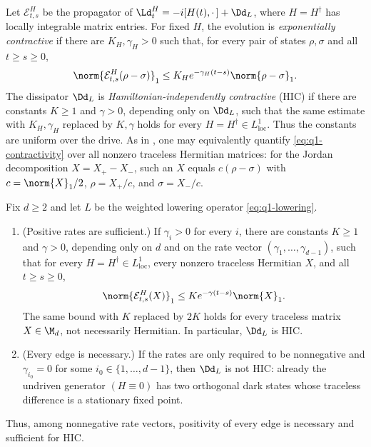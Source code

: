 \documentclass[class=article,11pt,a4paper,crop=false]{standalone}
\begin{document}
\begin{definition}\label{def:q1-hic}
	Let $\mathcal E^H_{t,s}$ be the propagator of
	$\Ld^H_t=-i[H(t),\cdot\,]+\Dd_L$, where $H=H^\dagger$ has locally integrable
	matrix entries. For fixed $H$, the evolution is \emph{exponentially
		contractive} if there are $K_H,\gamma_H>0$ such that, for every pair of
	states $\rho,\sigma$ and all $t\ge s\ge0$,
	\begin{equation}
		\norm{\mathcal E^H_{t,s}(\rho-\sigma)}_1
		\le K_H e^{-\gamma_H(t-s)}\norm{\rho-\sigma}_1.
		\label{eq:q1-contractivity}
	\end{equation}
	The dissipator $\Dd_L$ is \emph{Hamiltonian-independently contractive} (HIC)
	if there are constants $K\ge1$ and $\gamma>0$, depending only on $\Dd_L$,
	such that the same estimate with $K_H,\gamma_H$ replaced by $K,\gamma$
	holds for every $H=H^\dagger\in L^1_{\mathrm{loc}}$. Thus the constants are
	uniform over the drive. As in
	, one may equivalently quantify
	\eqref{eq:q1-contractivity} over all nonzero traceless Hermitian matrices:
	for the Jordan decomposition $X=X_+-X_-$, such an $X$ equals
	$c(\rho-\sigma)$ with
	$c=\norm{X}_1/2$, $\rho=X_+/c$, and $\sigma=X_-/c$.
\end{definition}

\begin{theorem}[Resolution of Q1]\label{thm:q1-main}
	Fix $d\ge2$ and let $L$ be the weighted lowering operator
	\eqref{eq:q1-lowering}.
	\begin{enumerate}[label=\textup{(\roman*)}]
		\item \textup{(Positive rates are sufficient.)} If $\gamma_i>0$ for every
		      $i$, there are constants $K\ge1$ and $\gamma>0$, depending only on
		      $d$ and on the rate vector
		      $(\gamma_1,\dots,\gamma_{d-1})$, such that for every
		      $H=H^\dagger\in L^1_{\mathrm{loc}}$, every nonzero traceless
		      Hermitian $X$, and all $t\ge s\ge0$,
		      \begin{equation}
			      \norm{\mathcal E^H_{t,s}(X)}_1
			      \le K e^{-\gamma(t-s)}\norm{X}_1.
			      \label{eq:q1-uniform-bound}
		      \end{equation}
		      The same bound with $K$ replaced by $2K$ holds for every traceless
		      matrix $X\in\M_d$, not necessarily Hermitian. In particular,
		      $\Dd_L$ is HIC.
		\item \textup{(Every edge is necessary.)} If the rates are only required
		      to be nonnegative and
		      $\gamma_{i_0}=0$ for some $i_0\in\{1,\dots,d-1\}$, then
		      $\Dd_L$ is not HIC: already the undriven generator $(H\equiv0)$ has
		      two orthogonal dark states whose traceless difference is a
		      stationary fixed point.
	\end{enumerate}
	Thus, among nonnegative rate vectors, positivity of every edge is necessary
	and sufficient for HIC.
\end{theorem}
\end{document}
